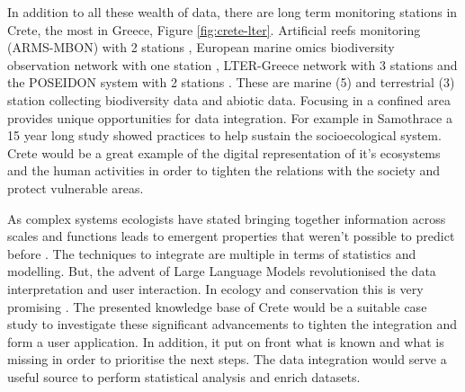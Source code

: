 In addition to all these wealth of data, there are long term monitoring stations in 
Crete, the most in Greece, Figure \ref{fig:crete-lter}.
Artificial reefs monitoring (ARMS-MBON) with 2 stations \parencite{obst2020arms},
European marine omics biodiversity observation network with one station \parencite{santi2023emobon},
LTER-Greece network with 3 stations \parencite{Skoulikidis2021lter} and the POSEIDON system with 2 stations \parencite{ntoumas2022}. 
These are marine (5) and terrestrial (3) station collecting biodiversity data and abiotic data.
Focusing in a confined area provides unique opportunities for data integration.
For example in Samothrace \parencite{noll2024insights} a 15 year long study 
showed practices to help sustain the socioecological system.
Crete would be a great example of the digital representation of it's ecosystems
and the human activities in order to tighten the relations with the society and 
protect vulnerable areas.

As complex systems ecologists have stated bringing together information across
scales \parencite{brown2004METABOLIC} and functions leads to emergent properties that weren't possible to 
predict before \parencite{smith2016Origin}. The techniques to integrate are multiple in terms of statistics and modelling. But,
the advent of Large Language Models revolutionised the data interpretation and 
user interaction. In ecology and conservation this is very promising \parencite{doi2024biodiversity}.
The presented knowledge base of Crete would be a suitable 
case study to investigate these significant advancements to tighten the integration and form a 
user application. In addition, it put on front what is known and what is missing 
in order to prioritise the next steps. The data integration would serve a useful 
source to perform statistical analysis and enrich datasets.

